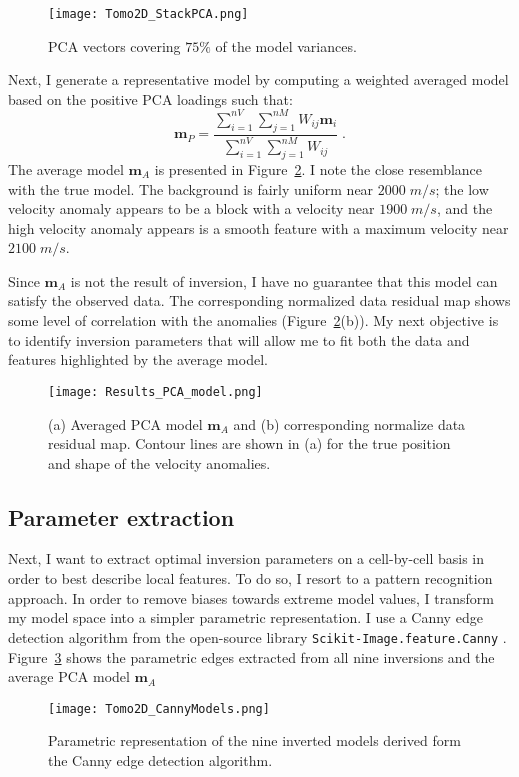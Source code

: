 \begin{figure}
{\centering
\texttt{[image: Tomo2D\_StackPCA.png]}
\caption{PCA vectors covering $75\%$ of the model variances.}\label{PCA_vectors}}
\end{figure}

Next, I generate a representative model by computing a weighted averaged model based on the positive PCA loadings such that:
\begin{equation}\label{weightedaverage}
\mathbf{m}_P = \frac{\sum_{i=1}^{nV} \sum_{j=1}^{nM} W_{ij} \mathbf{m}_i}{ \sum_{i=1}^{nV} \sum_{j=1}^{nM} W_{ij}} \;.
\end{equation}
The average model $\mathbf{m}_A$ is presented in Figure~\ref{PCA_model}. I note the close resemblance with the true model. The background is fairly uniform near $2000\;m/s$; the low velocity anomaly appears to be a block with a velocity near $1900\;m/s$, and the high velocity anomaly appears is a smooth feature with a maximum velocity near $2100\;m/s$.

Since $\mathbf{m}_A$ is not the result of inversion, I have no guarantee that this model can satisfy the observed data.
The corresponding normalized data residual map shows some level of correlation with the anomalies (Figure~\ref{PCA_model}(b)). My next objective is to identify inversion parameters that will allow me to fit both the data and features highlighted by the average model.
\begin{figure}
{\centering
\texttt{[image: Results\_PCA\_model.png]}
\caption{(a) Averaged PCA model $\mathbf{m}_A$ and (b) corresponding normalize data residual map. Contour lines are shown in (a) for the true position and shape of the velocity anomalies.}\label{PCA_model}}
\end{figure}

\subsection{Parameter extraction}
Next, I want to extract optimal inversion parameters on a cell-by-cell basis in order to best describe local features. To do so, I resort to a pattern recognition approach. In order to remove biases towards extreme model values, I transform my model space into a simpler parametric representation. I use a Canny edge detection algorithm from the open-source library \texttt{Scikit-Image.feature.Canny} \cite[]{Pedregosa2011}.
Figure~\ref{CannyEdges} shows the parametric edges extracted from all nine inversions and the average PCA model $\mathbf{m}_A$
\begin{figure}
\texttt{[image: Tomo2D\_CannyModels.png]}
\caption{Parametric representation of the nine inverted models derived form the Canny edge detection algorithm.}
\label{CannyEdges}
\end{figure}

